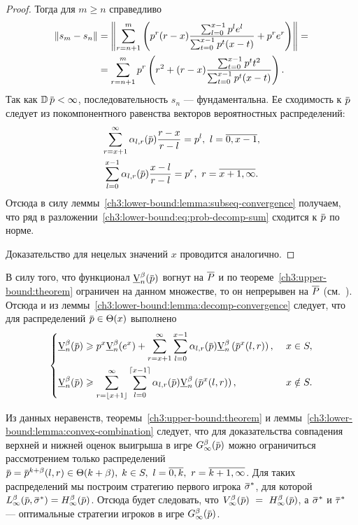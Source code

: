 {\begin{proof}
  Тогда для $m \geqslant n$ справедливо
  \begin{align*}
    \left\lVert s_m-s_n\right\rVert
    &= \left\lVert
      \sum_{r=n+1}^m \left(
      p^r (r-x) \frac{\sum_{l=0}^{x-1} p^l e^l}{\sum_{t=0}^{x-1} p^t (x-t)} + p^r e^r
      \right)\right\rVert =\\
    &= \sum_{r=n+1}^m p^r \left(
      r^2 + (r-x) \frac{\sum_{t=0}^{x-1} p^t t^2}{\sum_{t=0}^{x-1} p^t (x-t)}
      \right).
  \end{align*}
  Так как $\D \p < \infty$, последовательность $s_n$ --- фундаментальна.
  Ее сходимость к $\p$ следует из покомпонентного равенства векторов вероятностных распределений:
  \begin{gather*}
    \sum_{r=x+1}^\infty \alpha_{l,r}(\p) \frac{r-x}{r-l} = p^l,\ l = \overline{0, x-1}, \\
    \sum_{l=0}^{x-1} \alpha_{l,r}(\p) \frac{x-l}{r-l} = p^r,\ r = \overline{x+1, \infty}.
  \end{gather*}
  Отсюда в силу леммы~\ref{ch3:lower-bound:lemma:subseq-convergence} получаем, что ряд в разложении~\eqref{ch3:lower-bound:eq:prob-decomp-sum} сходится к $\p$ по норме.

  Доказательство для нецелых значений $x$ проводится аналогично.
\end{proof}

В силу того, что функционал $\LowV(\p)$ вогнут на $\overline{P}$ и по теореме~\ref{ch3:upper-bound:theorem} ограничен на данном множестве, то он непрерывен на $\overline{P}$ (см.~\cite[Теорема 1.7.1]{polovinkin04}).
Отсюда и из леммы~\ref{ch3:lower-bound:lemma:decomp-convergence} следует, что для распределений $\p \in \Theta(x)$ выполнено
\begin{equation*}
  \left\{
  \begin{aligned}
    \LowV(\p) &\geqslant
      p^x \LowV(e^x) + \sum_{r=x+1}^\infty \sum_{l=0}^{x-1} \alpha_{l,r}(\p) \LowV \left( \p^x(l, r) \right),&\ x \in S,\\
    \LowV(\p) &\geqslant 
      \sum_{r=\floor{x+1}}^\infty \sum_{l=0}^{\ceil{x-1}} \alpha_{l,r}(\p) \LowV \left( \p^x(l, r) \right),&\ x \notin S.
  \end{aligned}
  \right.
\end{equation*}

Из данных неравенств, теоремы~\ref{ch3:upper-bound:theorem} и леммы~\ref{ch3:lower-bound:lemma:convex-combination} следует, что для доказательства совпадения верхней и нижней оценок выигрыша в игре $\theG[\infty](\p)$ можно ограничиться рассмотрением только распределений %
$\p = \p^{k+\beta}(l, r) \in \Theta(k + \beta), \; k \in S,\ l = \overline{0, k},\ r = \overline{k+1, \infty}$.
Для таких распределений мы построим стратегию первого игрока $\sigmav^*$, для которой $\Low[\infty](\p, \sigmav^*) = \High[\infty](\p)$.
Отсюда будет следовать, что $\V[\infty](\p)~=~\High[\infty](\p)$, а $\sigmav^*$ и $\tauv^*$ --- оптимальные стратегии игроков в игре $\theG[\infty](\p)$.

}
